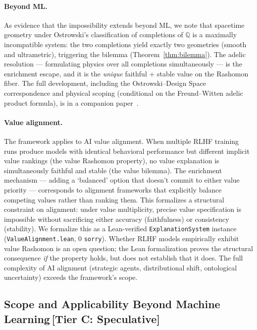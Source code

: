\documentclass[11pt,a4paper]{article}
\begin{document}
\paragraph{Beyond ML.} As evidence that the impossibility extends beyond ML,
we note that spacetime geometry under Ostrowski's classification of
completions of $\mathbb{Q}$ is a maximally incompatible system: the two
completions yield exactly two geometries (smooth and ultrametric), triggering
the bilemma (Theorem~\ref{thm:bilemma}).  The adelic resolution --- formulating physics over all completions
simultaneously --- is the enrichment escape, and it is the \emph{unique}
faithful + stable value on the Rashomon fiber. The full development, including
the Ostrowski--Design Space correspondence and physical scoping (conditional
on the Freund--Witten adelic product formula), is in a companion
paper~\cite{caraker2026ostrowski}.

\paragraph{Value alignment.} The framework applies to AI value alignment. When multiple RLHF training runs produce models with identical behavioral performance but different implicit value rankings (the value Rashomon property), no value explanation is simultaneously faithful and stable (the value bilemma). The enrichment mechanism --- adding a `balanced' option that doesn't commit to either value priority --- corresponds to alignment frameworks that explicitly balance competing values rather than ranking them. This formalizes a structural constraint on alignment: under value multiplicity, precise value specification is impossible without sacrificing either accuracy (faithfulness) or consistency (stability). We formalize this as a Lean-verified \texttt{ExplanationSystem} instance (\texttt{ValueAlignment.lean}, 0 \texttt{sorry}).  Whether RLHF models empirically exhibit value Rashomon is an open question; the Lean formalization proves the structural consequence \emph{if} the property holds, but does not establish that it does.  The full complexity of AI alignment (strategic agents, distributional shift, ontological uncertainty) exceeds the framework's scope.

\subsection{Scope and Applicability Beyond Machine Learning\,\textnormal{\normalsize[Tier C: Speculative]}}
\label{sec:scope}
\end{document}
